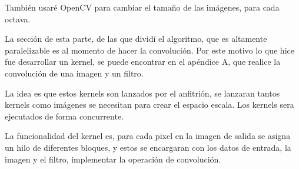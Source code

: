  


También usaré OpenCV para cambiar el tamaño de las imágenes, para cada octava.

La sección de esta parte, de las que dividí el algoritmo, que es altamente paralelizable es al momento de hacer la convolución. Por este motivo lo que hice fue desarrollar un kernel, se puede encontrar en el apéndice A, que realice la convolución de una imagen y un filtro.

La idea es que estos kernels son lanzados por el anfitrión, se lanzaran tantos kernels como imágenes se necesitan para crear el espacio escala. Los kernels sera ejecutados de forma concurrente. 

La funcionalidad del kernel es, para cada pixel en la imagen de salida se asigna un hilo de diferentes bloques, y estos se encargaran con los datos de entrada, la imagen y el filtro, implementar la operación de convolución.\\

